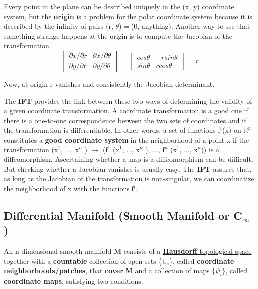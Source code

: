Every point in the plane can be described uniquely in the (x, y) coordinate system,
but the \textbf{origin} is a problem for the polar coordinate system because it is described
by the infinity of pairs (r, $\theta$) = (0, anything). Another way to see that something
strange happens at the origin is to compute the Jacobian of the transformation.
\begin{equation}
    \begin{vmatrix}
        \partial x / \partial r & \partial x / \partial \theta \\ 
        \partial y / \partial r & \partial y / \partial \theta 
   \end{vmatrix} = 
   \begin{vmatrix}
    cos \theta & -r sin \theta \\ 
    sin \theta & r cos \theta 
\end{vmatrix} = r
\end{equation}

Now, at origin r vanishes and consistently the Jacobian determinant.

The \textbf{IFT} provides the link between these two ways of
determining the validity of a given coordinate transformation. A coordinate transformation is a good one 
if there is a one-to-one correspondence between the two sets of coordinates and if the transformation is differentiable.
In other words, a set of functions {f$^i$(x)} on $\mathbb{R}^n$ constitutes a \textbf{good coordinate system} in the 
neighborhood of a point x if the transformation (x$^1$, ..., x$^n$ ) $\rightarrow$ (f$^1$ (x$^1$, ..., x$^n$ ), ..., f$^n$ (x$^1$, ..., x$^n$)) is a diffeomorphism.
Ascertaining whether a map is a diffeomorphism can be difficult. 
But checking whether a Jacobian vanishes is usually easy. 
The \textbf{IFT} assures that, as long as the Jacobian of the transformation is non-singular, 
we can coordinatize the neighborhood of x with the functions f$^i$.

\subsection{Differential Manifold (Smooth Manifold or C\texorpdfstring{$_\infty$ } d)}
An n-dimensional smooth manifold \textbf{M} consists of a  \href{https://en.wikipedia.org/wiki/Hausdorff_space}{\textbf{Hausdorff} topological space}
together with a \textbf{countable} collection of open sets \{U$_i$\}, called \textbf{coordinate neighborhoods/patches}, 
that \textbf{cover} \textbf{M} and a collection of maps \{$\psi_i$\}, called \textbf{coordinate
maps}, satisfying two conditions.

